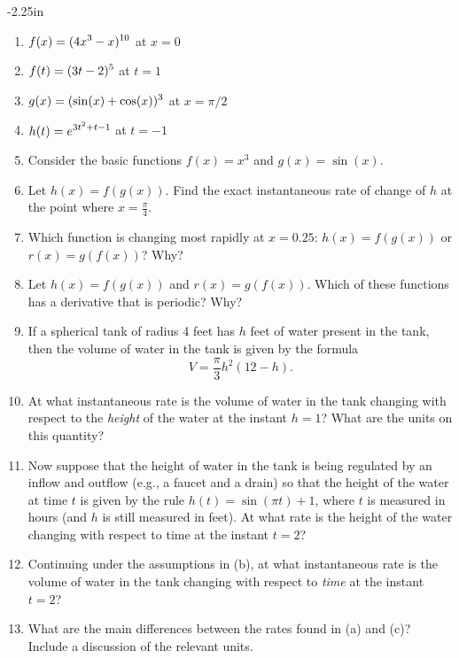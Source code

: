 \begin{adjustwidth*}{}{-2.25in}
\begin{multicols*}{2}

\begin{enumerate}[1),resume]
\item $\displaystyle f(x) = (4x^3 - x)^{10}$ at $x = 0$
\item $\displaystyle f(t) = (3t-2)^5$ at $t = 1$
\item $\displaystyle g(x) = (\sin(x) + \cos(x))^3$ at $x = \pi/2$
\item $\displaystyle h(t) = e^{3t^2 + t -1}$ at $t = -1$

\item Consider the basic functions $f(x) = x^3$ and $g(x) = \sin(x)$.
\ba
	\item Let $h(x) = f(g(x))$.  Find the exact instantaneous rate of change of $h$ at the point where $x = \frac{\pi}{4}.$
	\item Which function is changing most rapidly at $x = 0.25$:  $h(x) = f(g(x))$ or $r(x) = g(f(x))$?  Why?
	\item Let $h(x) = f(g(x))$ and $r(x) = g(f(x))$.  Which of these functions has a derivative that is periodic?  Why?
\ea

\item If a spherical tank of radius 4 feet has $h$ feet of water present in the tank, then the volume of water in the tank is given by the formula
$$V = \frac{\pi}{3} h^2(12-h).$$
\ba
	\item At what instantaneous rate is the volume of water in the tank changing with respect to the \emph{height} of the water at the instant $h = 1$?  What are the units on this quantity?
	\item Now suppose that the height of water in the tank is being regulated by an inflow and outflow (e.g., a faucet and a drain) so that the height of the water at time $t$ is given by the rule $h(t) = \sin(\pi t) + 1$, where $t$ is measured in hours (and $h$ is still measured in feet).  At what rate is the height of the water changing with respect to time at the instant $t = 2$?
	\item Continuing under the assumptions in (b), at what instantaneous rate is the volume of water in the tank changing with respect to \emph{time} at the instant $t = 2$?  
	\item What are the main differences between the rates found in (a) and (c)?  Include a discussion of the relevant units.
\ea
\end{enumerate}

\end{multicols*}
\end{adjustwidth*}

